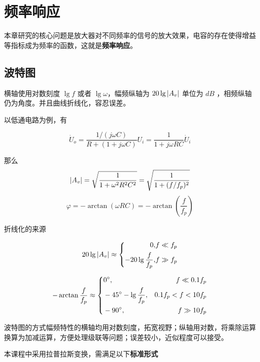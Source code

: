 \documentclass[cn,11pt,chinese,black,simple]{../elegantbook}
\begin{document}
\fi 

\chapter{频率响应}

本章研究的核心问题是放大器对不同频率的信号的放大效果，电容的存在使得增益等指标成为频率的函数，这就是\textbf{频率响应}。



\section{波特图}

横轴使用对数刻度 \(\lg f\) 或者 \(\lg \omega\)，幅频纵轴为 \(20 \lg \left| A_v \right| \) 单位为 \(dB\) ，相频纵轴仍为角度。并且曲线折线化，容忍误差。

以低通电路为例，有

\[\dot{U}_o = \frac{1 / (j \omega C)}{R + (1 + j \omega C)} U_i = \frac{1}{1 + j \omega R C} \dot{U}_i\]

那么 \[\left| A_v \right| = \sqrt{\dfrac{1}{1 + \omega^2R^2C^2}} = \sqrt{\dfrac{1}{1 + (f / f_p)^2}}\] 
\[\varphi = -\arctan(\omega RC) = -\arctan(\dfrac{f}{f_p}) \] 

折线化的来源 



\begin{equation*}
    20 \lg \left| A_v \right| \approx \left\{
    \begin{aligned}
        0, &f \ll f_p\\
        -20\lg \dfrac{f}{f_p}, &f \gg f_p
    \end{aligned}
    \right.
\end{equation*}


\begin{equation*}
    -\arctan \frac{f}{f_p} \approx \left\{
    \begin{aligned}
        &0^{\circ}, &f \ll 0.1 f_p\\
        &-45^{\circ} - \lg \frac{f}{f_p}, &0.1  f_p <f < 10 f_p\\
        &-90^{\circ}, &f \gg 10 f_p
    \end{aligned}
    \right.
\end{equation*}

波特图的方式幅频特性的横轴均用对数刻度，拓宽视野；纵轴用对数，将乘除运算换算为加减运算，方便处理级联等问题；误差较小，近似程度可以接受。

本课程中采用拉普拉斯变换，需满足以下\textbf{标准形式}
\end{document}
